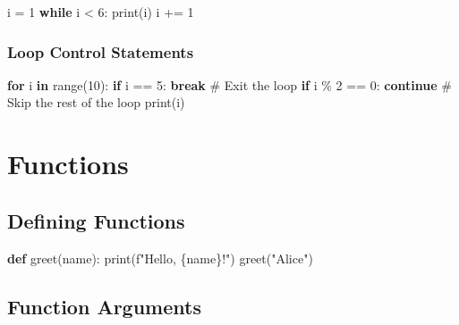 \documentclass[
  letterpaper,
  DIV=11,
  numbers=noendperiod]{scrreprt}
\newenvironment{Shaded}{\begin{snugshade}}{\end{snugshade}}
\newcommand{\BuiltInTok}[1]{\textcolor[rgb]{0.00,0.23,0.31}{#1}}
\newcommand{\CommentTok}[1]{\textcolor[rgb]{0.37,0.37,0.37}{#1}}
\newcommand{\ControlFlowTok}[1]{\textcolor[rgb]{0.00,0.23,0.31}{\textbf{#1}}}
\newcommand{\DecValTok}[1]{\textcolor[rgb]{0.68,0.00,0.00}{#1}}
\newcommand{\KeywordTok}[1]{\textcolor[rgb]{0.00,0.23,0.31}{\textbf{#1}}}
\newcommand{\NormalTok}[1]{\textcolor[rgb]{0.00,0.23,0.31}{#1}}
\newcommand{\OperatorTok}[1]{\textcolor[rgb]{0.37,0.37,0.37}{#1}}
\newcommand{\SpecialCharTok}[1]{\textcolor[rgb]{0.37,0.37,0.37}{#1}}
\newcommand{\SpecialStringTok}[1]{\textcolor[rgb]{0.13,0.47,0.30}{#1}}
\newcommand{\StringTok}[1]{\textcolor[rgb]{0.13,0.47,0.30}{#1}}
\begin{document}
\begin{Shaded}
\begin{Highlighting}[]
\NormalTok{i }\OperatorTok{=} \DecValTok{1}
\ControlFlowTok{while}\NormalTok{ i }\OperatorTok{\textless{}} \DecValTok{6}\NormalTok{:}
    \BuiltInTok{print}\NormalTok{(i)}
\NormalTok{    i }\OperatorTok{+=} \DecValTok{1}
\end{Highlighting}
\end{Shaded}

\subsubsection{Loop Control Statements}\label{loop-control-statements}

\begin{Shaded}
\begin{Highlighting}[]
\ControlFlowTok{for}\NormalTok{ i }\KeywordTok{in} \BuiltInTok{range}\NormalTok{(}\DecValTok{10}\NormalTok{):}
    \ControlFlowTok{if}\NormalTok{ i }\OperatorTok{==} \DecValTok{5}\NormalTok{:}
        \ControlFlowTok{break}  \CommentTok{\# Exit the loop}
    \ControlFlowTok{if}\NormalTok{ i }\OperatorTok{\%} \DecValTok{2} \OperatorTok{==} \DecValTok{0}\NormalTok{:}
        \ControlFlowTok{continue}  \CommentTok{\# Skip the rest of the loop}
    \BuiltInTok{print}\NormalTok{(i)}
\end{Highlighting}
\end{Shaded}

\section{Functions}\label{functions-1}

\subsection{Defining Functions}\label{defining-functions}

\begin{Shaded}
\begin{Highlighting}[]
\KeywordTok{def}\NormalTok{ greet(name):}
    \BuiltInTok{print}\NormalTok{(}\SpecialStringTok{f"Hello, }\SpecialCharTok{\{}\NormalTok{name}\SpecialCharTok{\}}\SpecialStringTok{!"}\NormalTok{)}
\NormalTok{greet(}\StringTok{"Alice"}\NormalTok{)}
\end{Highlighting}
\end{Shaded}

\subsection{Function Arguments}\label{function-arguments}
\end{document}
